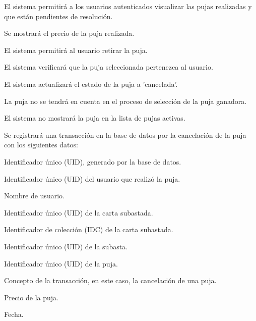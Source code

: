 \begin{RFSubastas}
	\item El sistema permitirá a los usuarios autenticados visualizar las pujas realizadas y que están pendientes de resolución.
		\begin{RFSubastas}
			\item Se mostrará el precio de la puja realizada.
			\item El sistema permitirá al usuario retirar la puja.
			\begin{RFSubastas}
				\item El sistema verificará que la puja seleccionada pertenezca al usuario.
				\item El sistema actualizará el estado de la puja a 'cancelada'.
				\item La puja no se tendrá en cuenta en el proceso de selección de la puja ganadora.
				\item El sistema no mostrará la puja en la lista de pujas activas.
				\item Se registrará una transacción en la base de datos por la cancelación de la puja con los siguientes datos:
				\begin{RFSubastas}
					\item Identificador único (UID), generado por la base de datos.
					\item Identificador único (UID) del usuario que realizó la puja.
					\item Nombre de usuario.
					\item Identificador único (UID) de la carta subastada.
					\item Identificador de colección (IDC) de la carta subastada.
					\item Identificador único (UID) de la subasta.
					\item Identificador único (UID) de la puja.
					\item Concepto de la transacción, en este caso, la cancelación de una puja.
					\item Precio de la puja.
					\item Fecha.
				\end{RFSubastas}
			\end{RFSubastas}
		\end{RFSubastas}
	

\end{RFSubastas}
